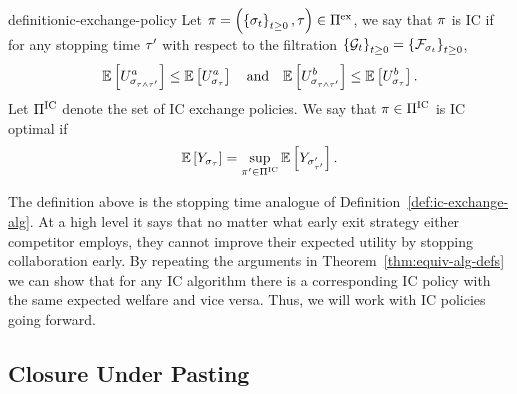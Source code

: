 \begin{restatable}{definition}{ic-exchange-policy}
    \label{def:ic-exchange-policy} 
    Let 
    \(
        \pi
        =
        \left(
            \left\{
                \sigma_{t}
            \right\}_{t\geq 0},
            \tau
        \right)
        \in\Pi^{\text{ex}}
    \),
    we say that $\pi$ is IC if 
    for any stopping time $\tau'$
    with respect to the filtration
    \(
        \left\{
            \mathcal{G}_{t}
        \right\}_{t\geq 0}
        =
        \left\{
            \mathcal{F}_{
                \sigma_{t}
            }
        \right\}_{t\geq 0}
    \),
    \[
        \mathbb{E}\left[
            U^a_{
                \sigma_{
                    \tau\wedge\tau'
                }
            }
        \right]
        \leq
        \mathbb{E}\left[
            U^a_{
                \sigma_{
                    \tau
                }
            }
        \right]
        \quad
        \text{and}
        \quad
        \mathbb{E}\left[
            U^b_{
                \sigma_{
                    \tau\wedge\tau'
                }
            }
        \right]
        \leq
        \mathbb{E}\left[
            U^b_{
                \sigma_{
                    \tau
                }
            }
        \right].
    \]
    Let $\Pi^{\text{IC}}$ denote the set of IC exchange policies. 
    We say that $\pi\in\Pi^{\text{IC}}$
    is IC optimal if 
    \[
        \mathbb{E}\left[
            Y_{
                \sigma_{\tau}
            }
        \right]
        =
        \sup_{
            \pi'\in\Pi^{\text{IC}}
        }
        \mathbb{E}\left[
            Y_{
                \sigma_{\tau'}'
            }
        \right] .
    \]
\end{restatable}  

The definition above is the stopping time analogue of Definition~\ref{def:ic-exchange-alg}. At a high level
it says that no matter what early exit strategy either competitor employs, they cannot improve their expected
utility by stopping collaboration early. By repeating the arguments in Theorem~\ref{thm:equiv-alg-defs} we can show that 
for any IC algorithm there is a corresponding IC policy with the same expected welfare and vice versa. Thus, 
we will work with IC policies going forward.

\subsection{Closure Under Pasting}

